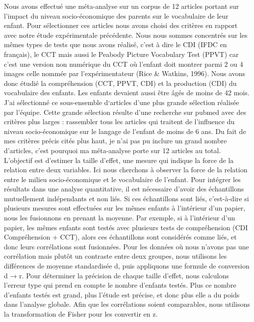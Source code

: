 \documentclass[english,man]{apa6}
\theoremstyle{definition}
\theoremstyle{definition}
\theoremstyle{definition}
\theoremstyle{remark}
\begin{document}
Nous avons effectué une méta-analyse sur un corpus de 12 articles
portant sur l'impact du niveau socio-économique des parents sur le
vocabulaire de leur enfant. Pour sélectionner ces articles nous avons
choisi des critères en rapport avec notre étude expérimentale
précédente. Nous nous sommes concentrés sur les mêmes types de tests que
nous avons réalisé, c'est à dire le CDI (IFDC en français), le CCT mais
aussi le Peabody Picture Vocabulary Test (PPVT) car c'est une version
non numérique du CCT où l'enfant doit montrer parmi 2 ou 4 images celle
nommée par l'expérimentateur (Rice \& Watkins, 1996). Nous avons donc
étudié la compréhension (CCT, PPVT, CDI) et la production (CDI) du
vocabulaire des enfants. Les enfants devaient aussi être âgés de moins
de 42 mois. J'ai sélectionné ce sous-ensemble d`articles d'une plus
grande sélection réalisée par l'équipe. Cette grande sélection résulte
d'une recherche sur pubmed avec des critères plus larges : rassembler
tous les articles qui traitent de l'influence du niveau socio-économique
sur le langage de l'enfant de moins de 6 ans. Du fait de mes critères
précis cités plus haut, je n'ai pas pu inclure un grand nombre
d'articles, c'est pourquoi ma méta-analyse porte sur 12 articles au
total. L'objectif est d'estimer la taille d'effet, une mesure qui
indique la force de la relation entre deux variables. Ici nous cherchons
à observer la force de la relation entre le milieu socio-économique et
le vocabulaire de l'enfant. Pour intégrer les résultats dans une analyse
quantitative, il est nécessaire d'avoir des échantillons mutuellement
indépendants et non liés. Si ces échantillons sont liés, c'est-à-dire si
plusieurs mesures sont effectuées sur les mêmes enfants à l'intérieur
d'un papier, nous les fusionnons en prenant la moyenne. Par exemple, si
à l'intérieur d'un papier, les mêmes enfants sont testés avec plusieurs
tests de compréhension (CDI Compréhension + CCT), alors ces échantillons
sont considérés comme liés, et donc leurs corrélations sont fusionnées.
Pour les données où nous n'avons pas une corrélation mais plutôt un
contraste entre deux groupes, nous utilisons les différences de moyenne
standardisée d, puis appliquons une formule de conversion d → r. Pour
déterminer la précision de chaque taille d'effet, nous calculons
l'erreur type qui prend en compte le nombre d'enfants testés. Plus ce
nombre d'enfants testés est grand, plus l'étude est précise, et donc
plus elle a du poids dans l'analyse globale. Afin que les corrélations
soient comparables, nous utilisons la transformation de Fisher pour les
convertir en z.
\end{document}
